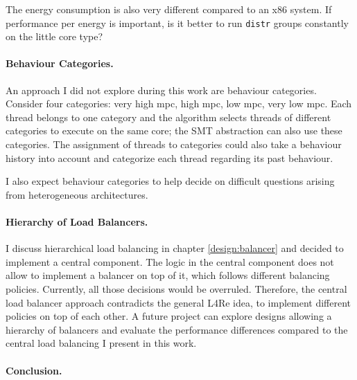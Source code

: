 The energy consumption is also very different compared to an x86 system.
If performance per energy is important, is it better to run \texttt{distr} groups
constantly on the little core type?


\paragraph{Behaviour Categories.}
An approach I did not explore during this work are behaviour categories.
Consider four categories: very high \gls{mpc}, high \gls{mpc}, low \gls{mpc},
very low \gls{mpc}.
Each thread belongs to one category and the algorithm selects threads of
different categories to execute on the same core; the SMT abstraction can also
use these categories.
The assignment of threads to categories could also take a behaviour history
into account and categorize each thread regarding its past behaviour.

I also expect behaviour categories to help decide on difficult questions
arising from heterogeneous architectures.

\paragraph{Hierarchy of Load Balancers.}
I discuss hierarchical load balancing in chapter \ref{design:balancer} and
decided to implement a central component.
The logic in the central component does not allow to implement a
balancer on top of it, which follows different balancing policies.
Currently, all those decisions would be overruled.
Therefore, the central load balancer approach contradicts the general L4Re
idea, to implement different policies on top of each other.
A future project can explore designs allowing a hierarchy of balancers and
evaluate the performance differences compared to the central load balancing I
present in this work.

\begin{comment}
\paragraph{Workload-Aware Balancing.}
The modular approach allows quick replacement and testing of different
algorithms in the various components.
If very specific workloads run on the system, tuned balancing algorithms for
this specific workload can be used to increase the performance of the system.
\end{comment}

\paragraph{Conclusion.\newline}

